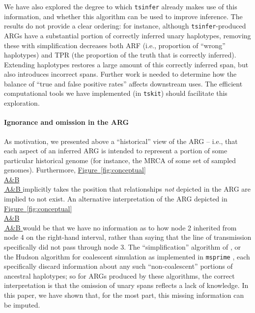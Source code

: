 \documentclass[10pt,twoside,lineno]{gsajnl}
\newcommand{\tskit}{\texttt{tskit}}
\newcommand{\tsinfer}{\texttt{tsinfer}}
\newcommand{\msprime}{\texttt{msprime}}
\newcommand*{\figref}[2][]{%
	\hyperref[{#2}]{%
		Figure~\ref*{#2}%
		\ifx\\#1\\%
		\else
		\,#1%
		\fi
	}%
}
\begin{document}
We have also explored the degree to which \tsinfer{} already makes use of this information,
and whether this algorithm can be used to improve inference.
The results do not provide a clear ordering:
for instance, although \tsinfer-produced ARGs
have a substantial portion of correctly inferred unary haplotypes,
removing these with simplification decreases both ARF
(i.e., proportion of ``wrong'' haplotypes)
and TPR (the proportion of the truth that is correctly inferred).
Extending haplotypes restores a large amount of this correctly inferred span,
but also introduces incorrect spans.
Further work is needed to determine how the balance of ``true and false positive rates''
affects downstream uses.
The efficient computational tools we have implemented (in \tskit{})
should facilitate this exploration.

\paragraph{Ignorance and omission in the ARG}
As motivation, we presented above a ``historical'' view of the ARG --
i.e., that each aspect of an inferred ARG is intended to represent
a portion of some particular historical genome
(for instance, the MRCA of some set of sampled genomes).
Furthermore, \figref[A\&B]{fig:conceptual} implicitly takes the position
that relationships \emph{not} depicted in the ARG are implied to not exist.
An alternative interpretation
of the ARG depicted in \figref[A\&B]{fig:conceptual} would be that we have no information as to 
how node 2 inherited from node 4 on the right-hand interval,
rather than saying that the line of transmission specifically did not pass
through node 3.
The ``simplification'' algorithm of \citet{kelleher2018efficient},
or the Hudson algorithm for coalescent simulation
as implemented in \msprime{} \citep{kelleher2016efficient},
each specifically discard information about any such ``non-coalescent'' portions of ancestral haplotypes;
so for ARGs produced by these algorithms, the correct interpretation is that
the omission of unary spans reflects a lack of knowledge.
In this paper, we have shown that, for the most part, this missing information can be imputed.
\end{document}

